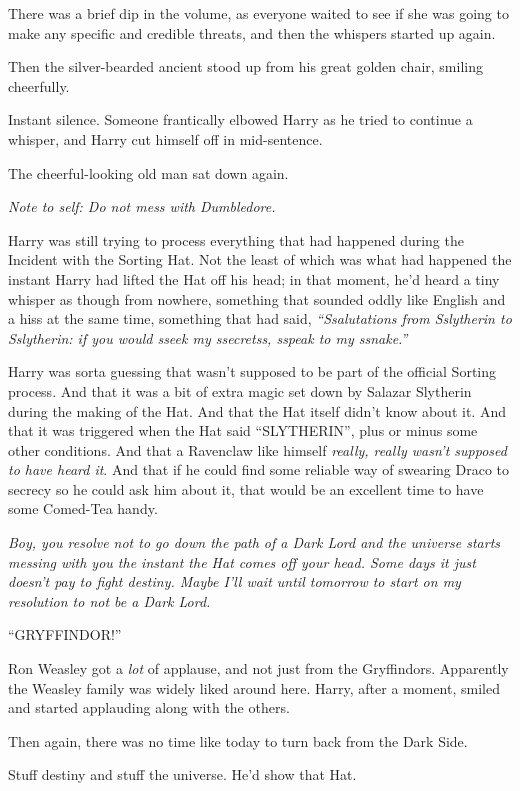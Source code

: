 There was a brief dip in the volume, as everyone waited to see if she
was going to make any specific and credible threats, and then the
whispers started up again.

Then the silver-bearded ancient stood up from his great golden chair,
smiling cheerfully.

Instant silence. Someone frantically elbowed Harry as he tried to
continue a whisper, and Harry cut himself off in mid-sentence.

The cheerful-looking old man sat down again.

\emph{Note to self: Do not mess with Dumbledore.}

Harry was still trying to process everything that had happened during
the Incident with the Sorting Hat. Not the least of which was what had
happened the instant Harry had lifted the Hat off his head; in that
moment, he'd heard a tiny whisper as though from nowhere, something that
sounded oddly like English and a hiss at the same time, something that
had said, \emph{``Ssalutations from Sslytherin to Sslytherin: if you
would sseek my ssecretss, sspeak to my ssnake.''}

Harry was sorta guessing that wasn't supposed to be part of the official
Sorting process. And that it was a bit of extra magic set down by
Salazar Slytherin during the making of the Hat. And that the Hat itself
didn't know about it. And that it was triggered when the Hat said
``SLYTHERIN'', plus or minus some other conditions. And that a Ravenclaw
like himself \emph{really, really wasn't supposed to have heard it}. And
that if he could find some reliable way of swearing Draco to secrecy so
he could ask him about it, that would be an excellent time to have some
Comed-Tea handy.

\emph{Boy, you resolve not to go down the path of a Dark Lord and the
universe starts messing with you the instant the Hat comes off your
head. Some days it just doesn't pay to fight destiny. Maybe I'll wait
until tomorrow to start on my resolution to not be a Dark Lord.}

``GRYFFINDOR!''

Ron Weasley got a \emph{lot} of applause, and not just from the
Gryffindors. Apparently the Weasley family was widely liked around here.
Harry, after a moment, smiled and started applauding along with the
others.

Then again, there was no time like today to turn back from the Dark
Side.

Stuff destiny and stuff the universe. He'd show that Hat.

